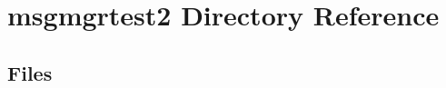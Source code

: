 \section{msgmgrtest2 Directory Reference}
\label{dir_a4aa455e93b148e078821f13854c3b8b}
\subsection*{Files}
\begin{DoxyCompactItemize}
\end{DoxyCompactItemize}
